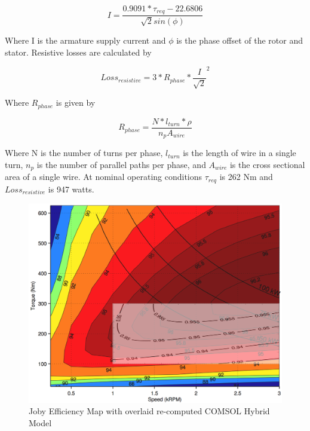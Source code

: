 \documentclass[]{aiaa-tc}%
\begin{document}
\begin{equation}
I = \frac{0.9091*\tau_{req}-22.6806}{\sqrt{2}sin(\phi)}
\label{eq:CurrentLoss}
\end{equation}

Where I is the armature supply current and $\phi$ is the phase offset of the rotor and stator.
Resistive losses are calculated by 

\begin{equation}
Loss_{resistive} =3*R_{phase}*\frac{I}{\sqrt{2}}^{2}
\label{eq:ResLoss}
\end{equation}

Where $R_{phase}$ is given by 

\begin{equation}
R_{phase} =\frac{N*l_{turn}*\rho}{n_{p}A_{wire}}
\label{eq:Rphase}
\end{equation}

Where N is the number of turns per phase, $l_{turn}$ is the length of wire in a single turn, $n_{p}$ is the number of parallel paths per phase, and $A_{wire}$ is the cross sectional area of a single wire.
At nominal operating conditions $\tau_{req}$ is 262 Nm and $Loss_{resistive}$ is 947 watts. 

\begin{figure}[!htb]%
	\centering
    \includegraphics[width=1.0\textwidth]{figures/map_compare.png}
	\caption{Joby Efficiency Map with overlaid re-computed COMSOL Hybrid Model}
	\label{fig:map}
\end{figure}
\end{document}
